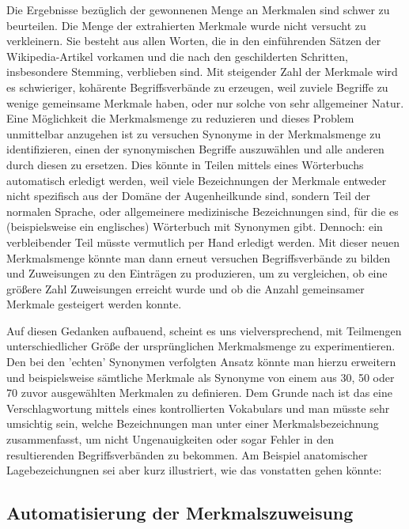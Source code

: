 \documentclass[pagesize,DIV=calc,12pt,draft]{scrreprt}
\begin{document}
Die Ergebnisse bezüglich der gewonnenen Menge an Merkmalen sind schwer zu beurteilen.
Die Menge der extrahierten Merkmale wurde nicht versucht zu verkleinern.
Sie besteht aus allen Worten, die in den einführenden Sätzen der Wikipedia-Artikel vorkamen und die nach den geschilderten Schritten, insbesondere Stemming, verblieben sind.
Mit steigender Zahl der Merkmale wird es schwieriger, kohärente Begriffsverbände zu erzeugen, weil zuviele Begriffe zu wenige gemeinsame Merkmale haben, oder nur solche von sehr allgemeiner Natur.
Eine Möglichkeit die Merkmalsmenge zu reduzieren und dieses Problem unmittelbar anzugehen ist zu versuchen Synonyme in der Merkmalsmenge zu identifizieren, einen der synonymischen Begriffe auszuwählen und alle anderen durch diesen zu ersetzen.
Dies könnte in Teilen mittels eines Wörterbuchs automatisch erledigt werden, weil viele Bezeichnungen der Merkmale entweder nicht spezifisch aus der Domäne der Augenheilkunde sind, sondern Teil der normalen Sprache, oder allgemeinere medizinische Bezeichnungen sind, für die es (beispielsweise ein englisches) Wörterbuch mit Synonymen gibt.
Dennoch: ein verbleibender Teil müsste vermutlich per Hand erledigt werden.
Mit dieser neuen Merkmalsmenge könnte man dann erneut versuchen Begriffsverbände zu bilden und Zuweisungen zu den Einträgen zu produzieren, um zu vergleichen, ob eine größere Zahl Zuweisungen erreicht wurde und ob die Anzahl gemeinsamer Merkmale gesteigert werden konnte.

Auf diesen Gedanken aufbauend, scheint es uns vielversprechend, mit Teilmengen unterschiedlicher Größe der ursprünglichen Merkmalsmenge zu experimentieren.
Den bei den 'echten' Synonymen verfolgten Ansatz könnte man hierzu erweitern und beispielsweise sämtliche Merkmale als Synonyme von einem aus 30, 50 oder 70 zuvor ausgewählten Merkmalen zu definieren.
Dem Grunde nach ist das eine Verschlagwortung mittels eines kontrollierten Vokabulars und man müsste sehr umsichtig sein, welche Bezeichnungen man unter einer Merkmalsbezeichnung zusammenfasst, um nicht Ungenauigkeiten oder sogar Fehler in den resultierenden Begriffsverbänden zu bekommen.
Am Beispiel anatomischer Lagebezeichungnen sei aber kurz illustriert, wie das vonstatten gehen könnte:

\subsection{Automatisierung der Merkmalszuweisung}
\end{document}
